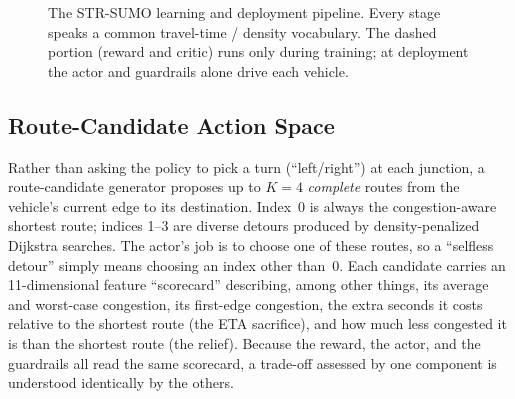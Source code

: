 \begin{figure}[!t]
\centering
{}
\caption{The STR-SUMO learning and deployment pipeline. Every stage speaks a common
travel-time / density vocabulary. The dashed portion (reward and critic) runs only during
training; at deployment the actor and guardrails alone drive each vehicle.}
\label{fig:pipeline}
\end{figure}

\subsection{Route-Candidate Action Space}
Rather than asking the policy to pick a turn (``left/right'') at each junction, a
route-candidate generator proposes up to $K{=}4$ \emph{complete} routes from the vehicle's
current edge to its destination. Index~0 is always the congestion-aware shortest route;
indices 1--3 are diverse detours produced by density-penalized Dijkstra searches. The
actor's job is to choose one of these routes, so a ``selfless detour'' simply means
choosing an index other than~0. Each candidate carries an 11-dimensional feature
``scorecard'' describing, among other things, its average and worst-case congestion, its
first-edge congestion, the extra seconds it costs relative to the shortest route (the
ETA sacrifice), and how much less congested it is than the shortest route (the relief).
Because the reward, the actor, and the guardrails all read the same scorecard, a
trade-off assessed by one component is understood identically by the others.

